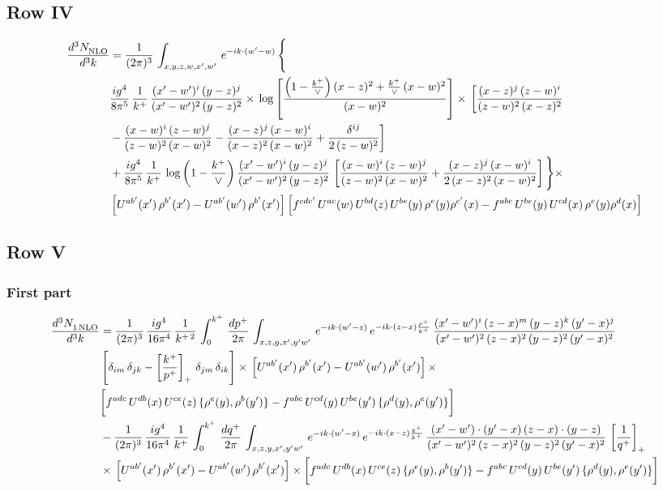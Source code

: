 \documentclass[9pt]{article}
\numberwithin{equation}{section}
\begin{document}
\subsection{Row IV}
\begin{align}
    \frac{d^{3}N_{\rm NLO}^{\rm}}{d^{3}k}  & =   \frac{1}{(2\pi)^{3}}\,
    \int_{x,y,z,w,x',w'}\,e^{-ik\cdot (w^\prime-w)}\,\Bigg\{\notag \\
& \frac{ig^{4}}{8\pi^{5}}\,\frac{1}{k^{+}}\,\frac{(x'-w')^{i}\,(y-z)^{j}}{(x'-w')^{2}\,(y-z)^{2}}\times\,\log{\left[\frac{\left(1-\frac{k^{+}}{\vee}\right)(x-z)^{2}+\frac{k^{+}}{\vee}\,(x-w)^{2}}{(x-w)^{2}}\right]}\times\, \bigg[\frac{(x-z)^{j}\,(z-w)^{i}}{(z-w)^{2}\,(x-z)^{2}}\notag \\ & -\frac{(x-w)^{i}\,(z-w)^{j}}{(z-w)^{2}\,(x-w)^{2}}-\frac{(x-z)^{j}\,(x-w)^{i}}{(x-z)^{2}\,(x-w)^{2}}+\frac{\delta^{ij}}{2\,(z-w)^{2}}\bigg] \notag \\
& + \frac{ig^{4}}{8\pi^{5}}\,\frac{1}{k^{+}}\,\log{\left(1-\frac{k^{+}}{\vee}\right)}\,\frac{(x'-w')^{i}\,(y-z)^{j}}{(x'-w')^{2}\,(y-z)^{2}}\,\left[\frac{(x-w)^{i}\,(z-w)^{j}}{(z-w)^{2}\,(x-w)^{2}}+\frac{(x-z)^{j}\,(x-w)^{i}}{2\, (x-z)^{2}\,(x-w)^{2}}\right]\Bigg\}\times\notag \\ &  \left[U^{ab'}(x')\,\rho^{b'}(x')-U^{ab'}(w')\,\rho^{b'}(x')\right] \left[f^{cdc'}\,U^{ac}(w)\,U^{bd}(z)\,U^{be}(y)\,\rho^{e}(y)\rho^{c'}(x)-f^{abc}\,U^{be}(y)\,U^{cd}(x)\,\rho^{e}(y)\rho^{d}(x)\right]
\end{align}
\subsection{Row V}
\subsubsection*{First part}
\begin{align}
     \frac{d^{3}N_{1\,\rm NLO}^{\rm}}{d^{3}k}  & =  \frac{1}{(2\pi)^{3}}\, \frac{ig^{4}}{16\pi^{4}}\, \frac{1}{k^{+\,2}}\,\int_{0}^{k^{+}}\, \frac{dp^{+}}{2\pi}\,\int_{x,z,y,x',y'w'}\,e^{-ik\cdot (w^\prime-z)}\,e^{-ik\cdot (z-x)\frac{p^{+}}{k^{+}}}\,\frac{(x'-w')^{i}\,(z-x)^{m}\,(y-z)^{k}\,(y'-x)^{j}}{(x'-w')^{2}\,(z-x)^{2}\,(y-z)^{2}\,(y'-x)^{2}}\,\notag \\ & \left[\delta_{im}\,\delta_{jk}-\left[\frac{k^{+}}{p^{+}}\right]_{+}\, \delta_{jm}\,\delta_{ik}\right]\times\, \left[U^{ab'}(x')\,\rho^{b'}(x')-U^{ab'}(w')\,\rho^{b'}(x')\right]\times\notag \\ & \bigg[f^{adc}\,U^{db}(x)\,U^{ce}(z)\, \{\rho^{e}(y),\rho^{b}(y')\}-f^{abc}\,U^{cd}(y)\,U^{be}(y')\, \{\rho^{d}(y),\rho^{e}(y')\}\bigg] \notag \\ & -\frac{1}{(2\pi)^{3}}\, \frac{ig^{4}}{16\pi^{4}}\, \frac{1}{k^{+}}\,\int_{0}^{k^{+}}\, \frac{dq^{+}}{2\pi}\,\int_{x,z,y,x',y'w'}\,e^{-ik\cdot (w^\prime-x)}\,e^{-ik\cdot (x-z)\frac{q^{+}}{k^{+}}}\,\frac{(x'-w')\cdot (y'-x)\,(z-x)\cdot (y-z)}{(x'-w')^{2}\,(z-x)^{2}\,(y-z)^{2}\,(y'-x)^{2}}\,\left[\frac{1}{q^{+}}\right]_{+}\notag \\ & \times\, \left[U^{ab'}(x')\,\rho^{b'}(x')-U^{ab'}(w')\,\rho^{b'}(x')\right]\times \bigg[f^{adc}\,U^{db}(x)\,U^{ce}(z)\, \{\rho^{e}(y),\rho^{b}(y')\}-f^{abc}\,U^{cd}(y)\,U^{be}(y')\, \{\rho^{d}(y),\rho^{e}(y')\}\bigg]
\end{align}
\end{document}
